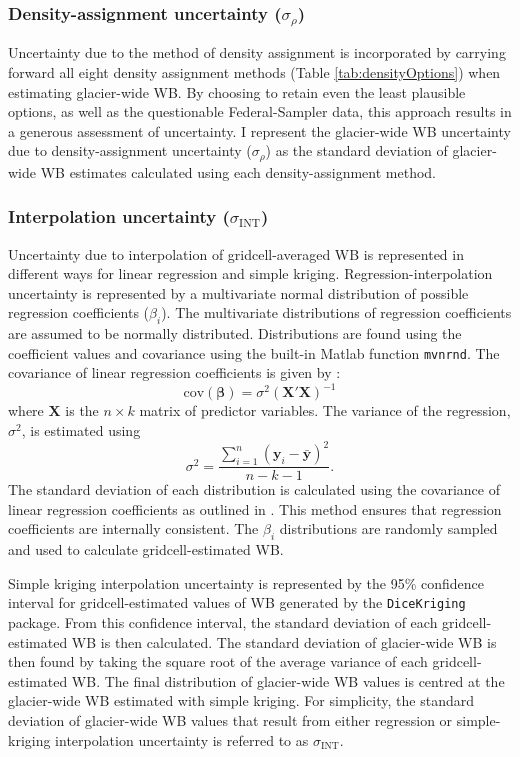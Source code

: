 \documentclass{sfuthesis}
\begin{document}
	\subsubsection{Density-assignment uncertainty ($\sigma_{\rho}$)}
Uncertainty due to the method of density assignment is incorporated by carrying forward all eight density assignment methods (Table \ref{tab:densityOptions}) when estimating glacier-wide WB. By choosing to retain even the least plausible options, as well as the questionable Federal-Sampler data, this approach results in a generous assessment of uncertainty. I represent the glacier-wide WB uncertainty due to density-assignment uncertainty ($\sigma_{\rho}$) as the standard deviation of glacier-wide WB estimates calculated using each density-assignment method.

	\subsubsection{Interpolation uncertainty ($\sigma_{\mathrm{INT}}$)}
Uncertainty due to interpolation of gridcell-averaged WB is represented in different ways for linear regression and simple kriging. Regression-interpolation uncertainty is represented by a multivariate normal distribution of possible regression coefficients ($\beta_i$). The multivariate distributions of regression coefficients are assumed to be normally distributed. Distributions are found using the coefficient values and covariance using the built-in Matlab function \texttt{mvnrnd}. The covariance of linear regression coefficients is given by \citep{Bagos2015}:
\begin{equation}
\mathrm{cov}\left( \boldsymbol{\beta} \right) = \sigma^2 \left( \boldsymbol{X}'  \boldsymbol{X} \right)^{-1}
\end{equation}
where $\boldsymbol{X}$ is the $n \times k$ matrix of predictor variables. The variance of the regression, $\sigma^2$, is estimated using
\begin{equation}
\sigma^2 = \frac{\sum^n_{i=1} \left(\boldsymbol{y}_i-\bar{\boldsymbol{y}} \right)^2}{n-k-1}.
\end{equation}
The standard deviation of each distribution is calculated using the covariance of linear regression coefficients as outlined in \cite{Bagos2015}. This method ensures that regression coefficients are internally consistent. The $\beta_i$ distributions are randomly sampled and used to calculate gridcell-estimated WB.	

Simple kriging interpolation uncertainty is represented by the 95\% confidence interval for gridcell-estimated values of WB generated by the \texttt{DiceKriging} package. From this confidence interval, the standard deviation of each gridcell-estimated WB is then calculated. The standard deviation of glacier-wide WB is then found by taking the square root of the average variance of each gridcell-estimated WB. The final distribution of glacier-wide WB values is centred at the glacier-wide WB estimated with simple kriging. For simplicity, the standard deviation of glacier-wide WB values that result from either regression or simple-kriging interpolation uncertainty is referred to as $\sigma_{\mathrm{INT}}$.
\end{document}

